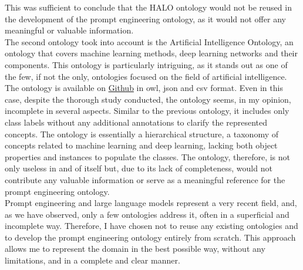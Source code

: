 This was sufficient to conclude that the HALO ontology would not be reused in the development of the prompt engineering ontology, as it would not offer any meaningful or valuable information.\\
The second ontology took into account is the Artificial Intelligence Ontology\cite{aio}, an ontology that covers machine learning methods, deep learning networks and their components. This ontology is particularly intriguing, as it stands out as one of the few, if not the only, ontologies focused on the field of artificial intelligence. The ontology is available on \href{https://github.com/berkeleybop/artificial-intelligence-ontology}{Github} in owl, json and csv format. Even in this case, despite the thorough study conducted, the ontology seems, in my opinion, incomplete in several aspects. Similar to the previous ontology, it includes only class labels without any additional annotations to clarify the represented concepts. The ontology is essentially a hierarchical structure, a taxonomy of concepts related to machine learning and deep learning, lacking both object properties and instances to populate the classes. The ontology, therefore, is not only useless in and of itself but, due to its lack of completeness, would not contribute any valuable information or serve as a meaningful reference for the prompt engineering ontology.\\ Prompt engineering and large language models represent a very recent field, and, as we have observed, only a few ontologies address it, often in a superficial and incomplete way. Therefore, I have chosen not to reuse any existing ontologies and to develop the prompt engineering ontology entirely from scratch. This approach allows me to represent the domain in the best possible way, without any limitations, and in a complete and clear manner.

\newpage
